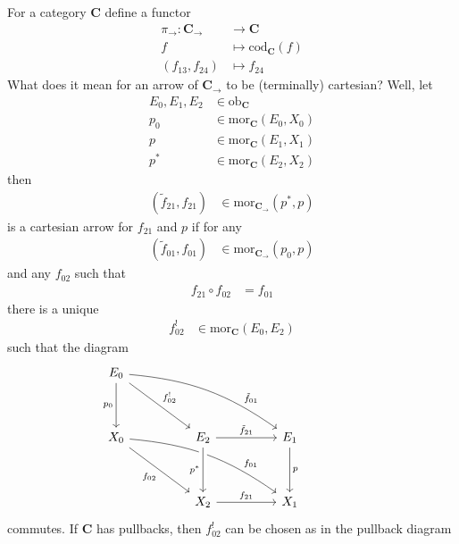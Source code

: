 \begin{exa}
\label{exa:catofarrpb}
For a category $\mathbf{C}$ define a functor
\begin{align*}
  \pi_{\rightarrow}
  \colon
  \mathbf{C}_{\rightarrow}
  &\rightarrow
  \mathbf{C}
  \\
  f
  &\mapsto
  \mathrm{cod}_{\mathbf{C}}(f)
  \\
  (f_{13},f_{24})
  &\mapsto
  f_{24}
\end{align*}
What does it mean for an arrow of $\mathbf{C}_{\rightarrow}$ to be (terminally) cartesian?
Well, let
\begin{align*}
  E_{0},
  E_{1},
  E_{2}
  &\in
  \mathrm{ob}_{\mathbf{C}}
  \\
  p_{0}
  &\in
  \mathrm{mor}_{\mathbf{C}}(E_{0},X_{0})
  \\
  p
  &\in
  \mathrm{mor}_{\mathbf{C}}(E_{1},X_{1})
  \\
  p^{\ast}
  &\in
  \mathrm{mor}_{\mathbf{C}}(E_{2},X_{2})
\end{align*}
then
\begin{align*}
  (\tilde{f}_{21},f_{21})
  &\in
  \mathrm{mor}_{\mathbf{C}_{\rightarrow}}(p^{\ast},p)
\end{align*}
is a cartesian arrow for $f_{21}$ and $p$ if for any
\begin{align*}
  (\tilde{f}_{01},f_{01})
  &\in
  \mathrm{mor}_{\mathbf{C}_{\rightarrow}}(p_{0},p)
\end{align*}
and any $f_{02}$ such that
\begin{align*}
  f_{21}
  \circ
  f_{02}
  &=
  f_{01}
\end{align*}
there is a unique
\begin{align*}
  f_{02}^{!}
  &\in
  \mathrm{mor}_{\mathbf{C}}(E_{0},E_{2})
\end{align*}
such that the diagram
\[
\begin{tikzcd}[sep=huge]
  E_{0}
  \arrow[bend left=15,near end]{drr}{\tilde{f}_{01}}
  \arrow{dr}{f_{02}^{!}}
  \arrow[swap]{d}{p_{0}}
  &
  &
  &
  \\
  X_{0}
  \arrow[bend left=15,near end]{drr}{f_{01}}
  \arrow[swap]{dr}{f_{02}}
  &
  E_{2}
  \arrow{r}{\tilde{f}_{21}}
  \arrow[swap,crossing over]{d}{p^{\ast}}
  &
  E_{1}
  \arrow{d}{p}
  \\
  &
  X_{2}
  \arrow{r}{f_{21}}
  &
  X_{1}
\end{tikzcd}
\]
commutes.
If $\mathbf{C}$ has pullbacks, then $f_{02}^{!}$ can be chosen as in the pullback diagram
\[
\begin{tikzcd}[sep=huge]

\end{tikzcd}\]
\end{exa}
